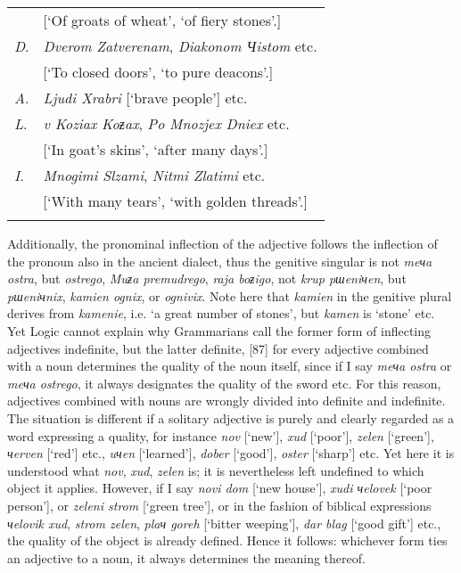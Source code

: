 \begin{footnotesize}
\begin{longtable}{ l l }
    & [‘Of groats of wheat’, ‘of fiery stones’.] \\
    \textit{D}. & \textit{Dverom Zatverenam}, \textit{Diakonom Чistom} etc. \\
    & [‘To closed doors’, ‘to pure deacons’.] \\
    \textit{A}. & \textit{Ljudi Xrabri} [‘brave people’] etc. \\
    \textit{L}. & \textit{v Koziax Koƶax}, \textit{Po Mnozjex Dniex} etc. \\
    & [‘In goat’s skins’, ‘after many days’.] \\
    \textit{I}. & \textit{Mnogimi Slzami}, \textit{Nitmi Zlatimi} etc. \\
    & [‘With many tears’, ‘with golden threads’.] \\
    \lspbottomrule
\end{longtable}
\end{footnotesize}

Additionally, the pronominal inflection of the adjective follows the inflection of the pronoun also in the ancient dialect, thus the genitive singular is not \textit{meчa ostra}, but \textit{ostrego}, \textit{Muƶa premudrego}, \textit{raja boƶigo}, not \textit{krup pшeniчen}, but \textit{pшe\-niчnix}, \textit{kamien ognix}, or \textit{ognivix}. Note here that \textit{kamien} in the genitive plural derives from \textit{kamenie}, i.e. ‘a great number of stones’, but \textit{kamen} is ‘stone’ etc. Yet Logic cannot explain why Grammarians call the former form of inflecting adjectives indefinite, but the latter definite, [87] for every adjective combined with a noun determines the quality of the noun itself, since if I say \textit{meчa ostra} or \textit{meчa ostrego}, it always designates the quality of the sword etc. For this reason, adjectives combined with nouns are wrongly divided into definite and indefinite. The situation is different if a solitary adjective is purely and clearly regarded as a word expressing a quality, for instance \textit{nov} [‘new’], \textit{xud} [‘poor’], \textit{zelen} [‘green’], \textit{чerven} [‘red’] etc., \textit{uчen} [‘learned’], \textit{dober} [‘good’], \textit{oster} [‘sharp’] etc. Yet here it is understood what \textit{nov}, \textit{xud}, \textit{zelen} is; it is nevertheless left undefined to which object it applies. However, if I say \textit{novi dom} [‘new house’], \textit{xudi чelovek} [‘poor person’], or \textit{zeleni strom} [‘green tree’], or in the fashion of biblical expressions \textit{чelovik xud}, \textit{strom zelen}, \textit{plaч goreh} [‘bitter weeping’], \textit{dar blag} [‘good gift’] etc., the quality of the object is already defined. Hence it follows: whichever form ties an adjective to a noun, it always determines the meaning thereof.

